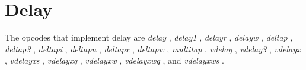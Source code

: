 \begin{comment}
\documentclass[10pt]{article}
\usepackage{fullpage, graphicx, url}
\setlength{\parskip}{1ex}
\setlength{\parindent}{0ex}
\title{Delay}



\begin{tabular}{ccc}
The Alternative Csound Reference Manual & & \\
Previous &Signal Modifiers &Next

\end{tabular}

\end{comment}
\section{Delay}


  The opcodes that implement delay are \emph{delay}
, \emph{delay1}
, \emph{delayr}
, \emph{delayw}
, \emph{deltap}
, \emph{deltap3}
, \emph{deltapi}
, \emph{deltapn}
, \emph{deltapx}
, \emph{deltapw}
, \emph{multitap}
, \emph{vdelay}
, \emph{vdelay3}
, \emph{vdelayx}
, \emph{vdelayxs}
, \emph{vdelayxq}
, \emph{vdelayxw}
, \emph{vdelayxwq}
, and \emph{vdelayxws}
. 


\begin{comment}
\begin{tabular}{lcr}
Previous &Home &Next \\
Convolution and Morphing &Up &Envelope Modifiers

\end{tabular}



\end{comment}
